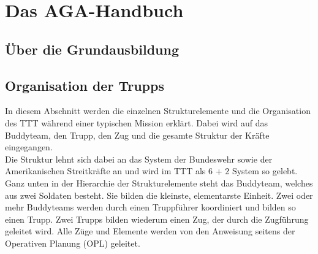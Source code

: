 
\section{Das AGA-Handbuch}

\subsection{Über die Grundausbildung}

\subsection{Organisation der Trupps}

	In diesem Abschnitt werden die einzelnen Strukturelemente und die Organisation des \ac{TTT} während einer typischen Mission erklärt. Dabei wird auf das Buddyteam, den Trupp, den Zug und die gesamte Struktur der Kräfte eingegangen.\\
	Die Struktur lehnt sich dabei an das System der Bundeswehr sowie der Amerikanischen Streitkräfte an und wird im \ac{TTT} als 6 + 2 System so gelebt.\\
	Ganz unten in der Hierarchie der Strukturelemente steht das Buddyteam, welches aus zwei Soldaten besteht. Sie bilden die kleinste, elementarste Einheit. Zwei oder mehr Buddyteams werden durch einen Truppführer koordiniert und bilden so einen Trupp. Zwei Trupps bilden wiederum einen Zug, der durch die Zugführung geleitet wird. Alle Züge und Elemente werden von den Anweisung seitens der Operativen Planung (\ac{OPL}) geleitet.  

